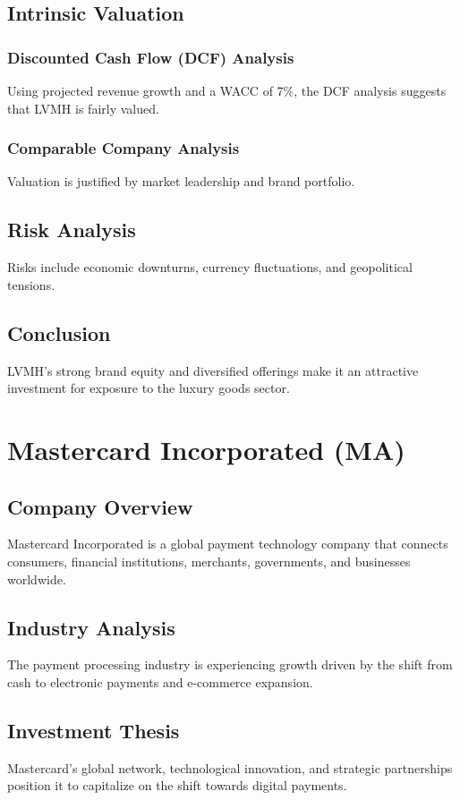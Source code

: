 \documentclass[12pt]{report}
\begin{document}
\section{Intrinsic Valuation}
\subsection{Discounted Cash Flow (DCF) Analysis}
Using projected revenue growth and a WACC of 7\%, the DCF analysis suggests that LVMH is fairly valued.

\subsection{Comparable Company Analysis}
Valuation is justified by market leadership and brand portfolio.

\section{Risk Analysis}
Risks include economic downturns, currency fluctuations, and geopolitical tensions.

\section{Conclusion}
LVMH's strong brand equity and diversified offerings make it an attractive investment for exposure to the luxury goods sector.

\chapter{Mastercard Incorporated (MA)}
\section{Company Overview}
Mastercard Incorporated is a global payment technology company that connects consumers, financial institutions, merchants, governments, and businesses worldwide.

\section{Industry Analysis}
The payment processing industry is experiencing growth driven by the shift from cash to electronic payments and e-commerce expansion.

\section{Investment Thesis}
Mastercard's global network, technological innovation, and strategic partnerships position it to capitalize on the shift towards digital payments.
\end{document}
